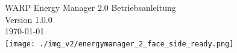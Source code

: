 \documentclass[a4paper,10pt]{article}
\title{}
\author{}
\begin{document}
\pagestyle{empty}
\begin{titlepage}
	\vspace*{-3.08cm}
	\colorbox{boxgray}{}
	\vfill
	\begin{center}
		\Huge
        \color{white}
		WARP Energy Manager 2.0 Betriebsanleitung\\\vspace{1cm}
		\large
		Version 1.0.0\\\vspace{0.25cm}
		\today\\
		\vspace*{1cm}
		\texttt{[image: ./img\_v2/energymanager\_2\_face\_side\_ready.png]}
	\end{center}
    \vfill
   	\pagecolor{covergray}

\end{titlepage}
\newpage
\pagecolor{white}
\null
\newpage
\pagestyle{fancy}
\end{document}
